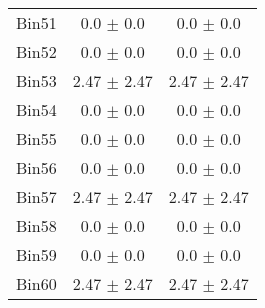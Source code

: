 \begin{tabular}{|c|c|c|}
     Bin51 & 0.0 $\pm$ 0.0 & 0.0 $\pm$ 0.0 \\ \cline{1-3} 
     Bin52 & 0.0 $\pm$ 0.0 & 0.0 $\pm$ 0.0 \\ \cline{1-3} 
     Bin53 & 2.47 $\pm$ 2.47 & 2.47 $\pm$ 2.47 \\ \cline{1-3} 
     Bin54 & 0.0 $\pm$ 0.0 & 0.0 $\pm$ 0.0 \\ \cline{1-3} 
     Bin55 & 0.0 $\pm$ 0.0 & 0.0 $\pm$ 0.0 \\ \cline{1-3} 
     Bin56 & 0.0 $\pm$ 0.0 & 0.0 $\pm$ 0.0 \\ \cline{1-3} 
     Bin57 & 2.47 $\pm$ 2.47 & 2.47 $\pm$ 2.47 \\ \cline{1-3} 
     Bin58 & 0.0 $\pm$ 0.0 & 0.0 $\pm$ 0.0 \\ \cline{1-3} 
     Bin59 & 0.0 $\pm$ 0.0 & 0.0 $\pm$ 0.0 \\ \cline{1-3} 
     Bin60 & 2.47 $\pm$ 2.47 & 2.47 $\pm$ 2.47 \\ \cline{1-3} 
  \end{tabular}
